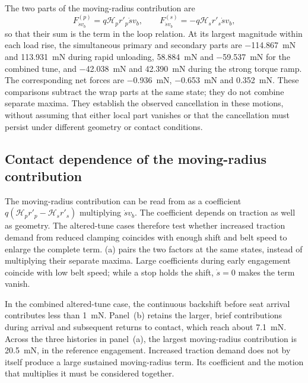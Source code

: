 \documentclass[11pt]{report}
\numberwithin{equation}{section}
\begin{document}
The two parts of the moving-radius contribution are
\begin{equation}
 F_{\dot s v_b}^{(p)}=q\mathcal H_pr'_p\dot s v_b,
 \qquad
 F_{\dot s v_b}^{(s)}=-q\mathcal H_sr'_s\dot s v_b,
 \label{eq:belt_moving_radius_wrap_parts}
\end{equation}
so that their sum is the term in the loop relation. At its largest
magnitude within each load rise, the simultaneous primary and secondary
parts are \SI{-114.867}{mN} and \SI{113.931}{mN} during rapid unloading,
\SI{58.884}{mN} and \SI{-59.537}{mN} for the combined tune, and
\SI{-42.038}{mN} and \SI{42.390}{mN} during the strong torque ramp.
The corresponding net forces are \SI{-0.936}{mN}, \SI{-0.653}{mN} and
\SI{0.352}{mN}. These comparisons subtract the wrap parts at the same
state; they do not combine separate maxima. They establish the observed
cancellation in these motions, without assuming that either local part
vanishes or that the cancellation must persist under different geometry
or contact conditions.

\subsection{Contact dependence of the moving-radius contribution}
\label{sec:results_belt_coefficient_driver}

The moving-radius contribution can be read from 
as a coefficient \(q(\mathcal H_pr'_p-\mathcal H_sr'_s)\) multiplying \(\dot s v_b\).
The coefficient depends on traction as well as geometry. The altered-tune
cases therefore test whether increased traction demand from reduced clamping
coincides with enough shift and belt speed to enlarge the complete term.
(a) pairs the two factors at the
same states, instead of multiplying their separate maxima.
Large coefficients during early engagement coincide with low belt speed;
while a stop holds the shift, \(\dot s=0\) makes the term vanish.

In the combined altered-tune case, the continuous backshift before seat
arrival contributes less than \SI{1}{mN}. Panel~(b) retains the larger,
brief contributions during arrival and subsequent returns to contact,
which reach about \SI{7.1}{mN}. Across the three histories in panel~(a),
the largest moving-radius contribution is \SI{20.5}{mN}, in the reference
engagement. Increased traction demand does not by itself produce a large
sustained moving-radius term. Its coefficient and the motion that multiplies
it must be considered together.
\end{document}
